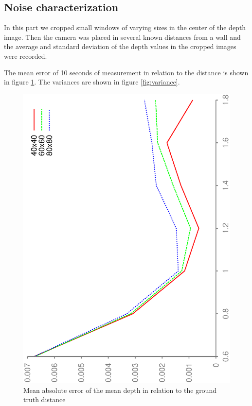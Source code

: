 \documentclass[DIV12,a4paper]{scrartcl}
\begin{document}
\subsection{Noise characterization}
\label{sec:noise_characterization}
In this part we cropped small windows of varying sizes in the center of the depth image. Then the camera was placed in several known distances from a wall and the average and standard deviation of the depth values in the cropped images were recorded.\par
The mean error of 10 seconds of measurement in relation to the distance is shown in figure \ref{fig:mean_error}. The variances are shown in figure \ref{fig:variance}.\par
\begin{figure}[h!tbp]
  \centering
  \includegraphics[height=0.8\textwidth,angle=270]{figures/mean_org_error.eps}
  \caption{Mean absolute error of the mean depth in relation to the ground truth distance}
  \label{fig:mean_error}
\end{figure}
\end{document}
